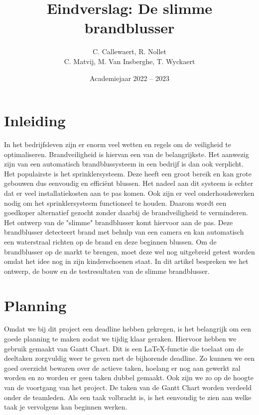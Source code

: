 \documentclass{kulakarticle}
\title{Eindverslag: De slimme brandblusser}
\author{C. Callewaert, R. Nollet \\
	 C. Matvij, M. Van Insberghe, T. Wyckaert }
\date{Academiejaar 2022 -- 2023}
\begin{document}
	
\maketitle

\tableofcontents
	
\section*{Inleiding}

In het bedrijfsleven zijn er enorm veel wetten en regels om de veiligheid te optimaliseren. Brandveiligheid is hiervan een van de belangrijkste. Het aanwezig zijn van een automatisch brandblussysteem in een bedrijf is dan ook verplicht. Het populairste is het sprinklersysteem. Deze heeft een groot bereik en kan grote gebouwen dus eenvoudig en efficiënt blussen. Het nadeel aan dit systeem is echter dat er veel installatiekosten aan te pas komen. Ook zijn er veel onderhoudswerken nodig om het sprinklersysteem functioneel te houden. Daarom wordt een goedkoper alternatief gezocht zonder daarbij de brandveiligheid te verminderen. Het ontwerp van de "slimme" brandblusser komt hiervoor aan de pas. Deze brandblusser detecteert brand met behulp van een camera en kan automatisch een waterstraal richten op de brand en deze beginnen blussen. Om  de brandblusser op de markt te brengen, moet deze wel nog uitgebreid getest worden omdat het idee nog in zijn kinderschoenen staat. In dit artikel bespreken we het ontwerp, de bouw en de testresultaten van de slimme brandblusser. 

\section{Planning}

Omdat we bij dit project een deadline hebben gekregen, is het belangrijk om een goede planning te maken zodat we tijdig klaar geraken. Hiervoor hebben we gebruik gemaakt van Gantt Chart. Dit is een \LaTeX-functie die toelaat om de deeltaken zorgvuldig weer te geven met de bijhorende deadline. Zo kunnen we een goed overzicht bewaren over de actieve taken, hoelang er nog aan gewerkt zal worden en zo worden er geen taken dubbel gemaakt. Ook zijn we zo op de hoogte van de voortgang van het project.  De taken van de Gantt Chart worden verdeeld onder de teamleden. Als een taak volbracht is, is het eenvoudig  te zien aan welke taak je vervolgens kan beginnen werken.
\end{document}
